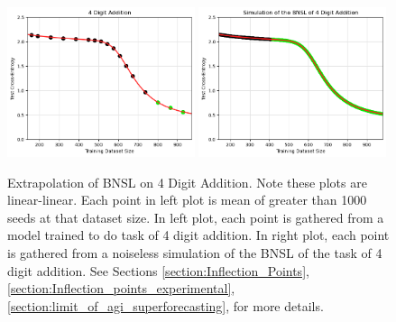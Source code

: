 \documentclass{article} %
\begin{document}
\begin{figure}[htbp]
    \centering


\includegraphics[width=0.49\textwidth]{figures/arithmetic/4_digit_addition__dataset_size.png}
\includegraphics[width=0.49\textwidth]{figures/arithmetic/4_digit_addition__dataset_size__very_first_version__simulation_limit.png}
\vspace{-4.7mm}
    \caption{
    Extrapolation of BNSL on 4 Digit Addition. Note these plots are linear-linear. Each point in left plot is mean of greater than 1000 seeds at that dataset size. In left plot, each point is gathered from a model trained to do task of 4 digit addition. In right plot, each point is gathered from a noiseless simulation of the BNSL of the task of 4 digit addition. See Sections \ref{section:Inflection_Points}, \ref{section:Inflection_points_experimental}, \ref{section:limit_of_agi_superforecasting}, for more details.
    }
    \label{fig:arithmetic}
\end{figure}
\vspace{-3.0mm}

\fi
\end{document}
